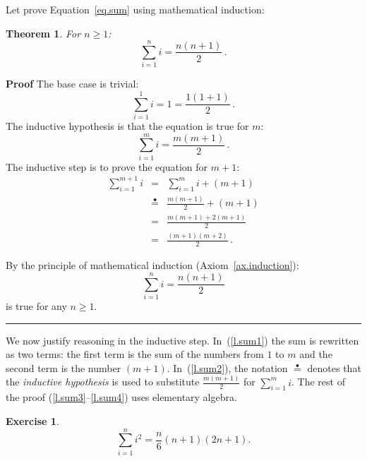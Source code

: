 \documentclass[11pt,a4paper]{report}
\newcommand*{\ih}{\stackrel{\bullet}{=}}
\newcommand*{\qed}{\hfill\rule{1ex}{1.5ex}}
\newtheorem{theorem}{Theorem}
\newtheorem{exercise}{Exercise}
\begin{document}
Let prove Equation~\ref{eq.sum} using mathematical induction:

\begin{theorem}\label{t.sum}
For $n\geq 1$:
\[
\sum_{i=1}^n i = \frac{n(n+1)}{2}\,.
\]
\end{theorem}

\textbf{Proof} The base case is trivial:
\[
\sum_{i=1}^1 i = 1 =\frac{1(1+1)}{2}\,.
\]
The inductive hypothesis is that the equation is true for $m$:
\[
\sum_{i=1}^{m} i = \frac{m(m+1)}{2}\,.
\]
The inductive step is to prove the equation for $m+1$:
\begin{eqnarray}
\sum_{i=1}^{m+1} i &=& \sum_{i=1}^m i + (m+1)\label{l.sum1}\\
&\ih{}&\frac{m(m+1)}{2} + (m+1)\label{l.sum2}\\
&=&\frac{m(m+1) + 2(m+1)}{2}\label{l.sum3}\\
&=&\frac{(m+1)(m+2)}{2}\,.\label{l.sum4}
\end{eqnarray}

By the principle of mathematical induction (Axiom~\ref{ax.induction}):
\[
\sum_{i=1}^n i = \frac{n(n+1)}{2}
\] is true for any $n\geq 1$.\qed

We now justify reasoning in the inductive step. In~(\ref{l.sum1}) the sum is rewritten as two terms: the first term is the sum of the numbers from $1$ to $m$ and the second term is the number $(m+1)$. In~(\ref{l.sum2}), the notation $\ih{}$ denotes that the \emph{inductive hypothesis} is used to substitute $\frac{m(m+1)}{2}$ for $\sum_{i=1}^m i$. The rest of the proof (\ref{l.sum3}--\ref{l.sum4}) uses elementary algebra.

\begin{exercise}
\[
\sum_{i=1}^n i^2 = \frac{n}{6}(n+1)(2n+1).
\]
\end{exercise}

\medskip

\begin{center}
\end{center}

\begin{center}
\end{center}
\end{document}
